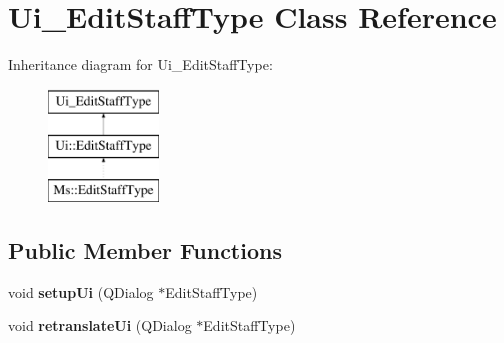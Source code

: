 \hypertarget{class_ui___edit_staff_type}{}\section{Ui\+\_\+\+Edit\+Staff\+Type Class Reference}
\label{class_ui___edit_staff_type}
Inheritance diagram for Ui\+\_\+\+Edit\+Staff\+Type\+:\begin{figure}[H]
\begin{center}
\leavevmode
\includegraphics[height=3.000000cm]{class_ui___edit_staff_type}
\end{center}
\end{figure}
\subsection*{Public Member Functions}
\begin{DoxyCompactItemize}
\item 
\mbox{\label{class_ui___edit_staff_type_ab8a0dd2d6eeb5518c9e87cdcb7e3c84c}} 
void {\bfseries setup\+Ui} (Q\+Dialog $\ast$Edit\+Staff\+Type)
\item 
\mbox{\label{class_ui___edit_staff_type_aeb283570acc800658389ba7c9077ae5e}} 
void {\bfseries retranslate\+Ui} (Q\+Dialog $\ast$Edit\+Staff\+Type)
\end{DoxyCompactItemize}
